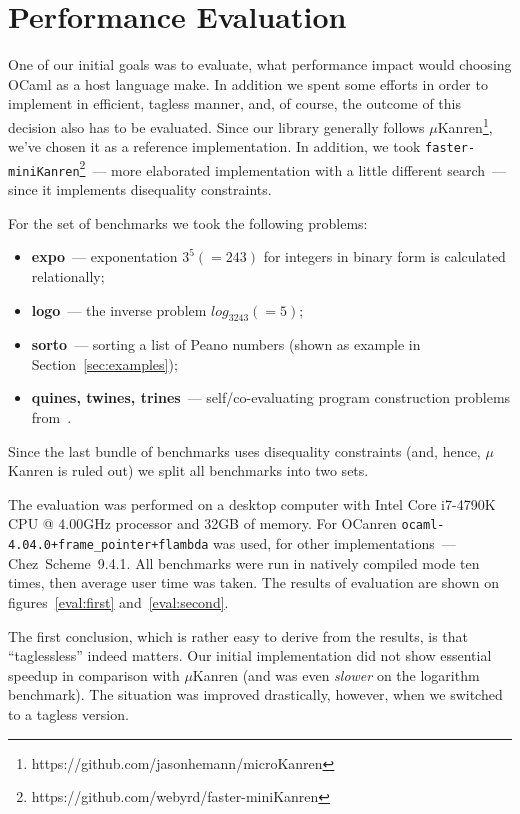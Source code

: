 \section{Performance Evaluation}
\label{sec:evaluation}

One of our initial goals was to evaluate, what performance impact would choosing
OCaml as a host language make. In addition we spent some efforts in order to implement \miniKanren in
efficient, tagless manner, and, of course, the outcome of this decision also has to be evaluated. 
Since our library generally follows $\mu$Kanren\footnote{https://github.com/jasonhemann/microKanren}, we've chosen it as a reference implementation.
In addition, we took \texttt{faster-miniKanren}\footnote{https://github.com/webyrd/faster-miniKanren}~--- more elaborated 
implementation with a little different search~--- since it implements disequality constraints. 

For the set of benchmarks we took the following problems:

\begin{itemize}
\item \textbf{expo}~--- exponentation $3^5(=243)$ for integers in binary form is calculated relationally;
\item \textbf{logo}~--- the inverse problem $log_3243(=5)$;
\item \textbf{sorto}~--- sorting a list of Peano numbers (shown as example in Section~\ref{sec:examples});
\item \textbf{quines, twines, trines}~--- self/co-evaluating program construction problems from~\cite{Untagged}.
\end{itemize}

Since the last bundle of benchmarks uses disequality constraints (and, hence, $\mu$Kanren is ruled out) we
split all benchmarks into two sets. 

The evaluation was performed on a desktop computer with Intel Core i7-4790K CPU @ 4.00GHz processor and 32GB of memory.
For OCanren \mbox{\texttt{ocaml-4.04.0+frame_pointer+flambda}} was used, for other implementations~--- Chez~Scheme~9.4.1. 
All benchmarks were run in natively compiled mode ten times, then average user time was taken. The results of evaluation
are shown on figures~\ref{eval:first} and~\ref{eval:second}.

The first conclusion, which is rather easy to derive from the results, is that ``taglessless'' indeed matters. Our initial
implementation did not show essential speedup in comparison with $\mu$Kanren (and was even \emph{slower} on the logarithm 
benchmark). The situation was improved drastically, however, when we switched to a tagless version.

